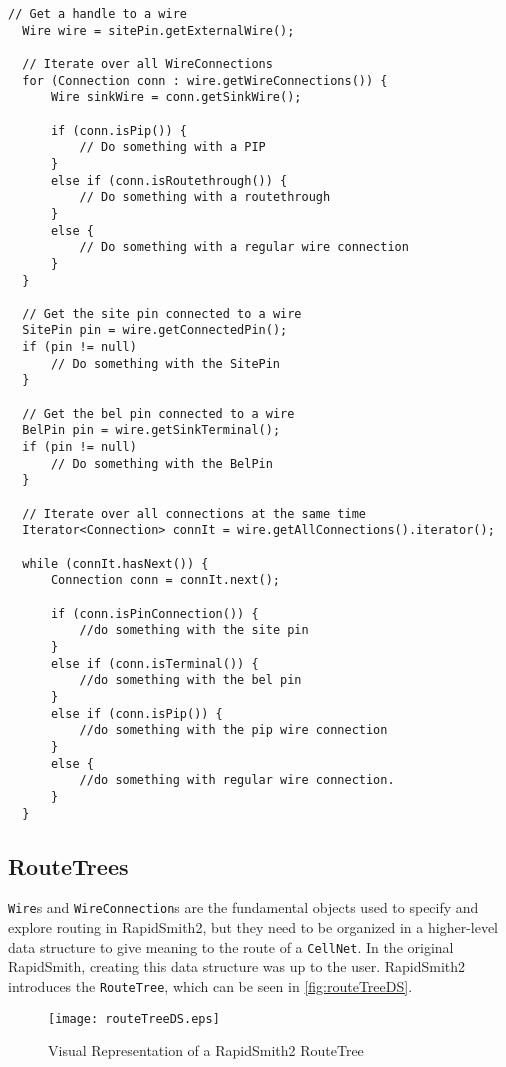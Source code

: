 \begin{lstlisting}[xleftmargin=1.5em, framexleftmargin=1.5em, caption=How to
iterate over Connections in RapidSmith2, label=code:connections] 
  // Get a handle to a wire
  Wire wire = sitePin.getExternalWire();

  // Iterate over all WireConnections
  for (Connection conn : wire.getWireConnections()) {
	  Wire sinkWire = conn.getSinkWire();

	  if (conn.isPip()) {
		  // Do something with a PIP
	  } 
	  else if (conn.isRoutethrough()) {
		  // Do something with a routethrough
	  } 
	  else {	
		  // Do something with a regular wire connection				
	  }
  }

  // Get the site pin connected to a wire
  SitePin pin = wire.getConnectedPin();
  if (pin != null)
	  // Do something with the SitePin
  }

  // Get the bel pin connected to a wire
  BelPin pin = wire.getSinkTerminal();
  if (pin != null)
	  // Do something with the BelPin
  }

  // Iterate over all connections at the same time
  Iterator<Connection> connIt = wire.getAllConnections().iterator();

  while (connIt.hasNext()) {
	  Connection conn = connIt.next();
	
	  if (conn.isPinConnection()) {
		  //do something with the site pin
	  }
	  else if (conn.isTerminal()) {
		  //do something with the bel pin 
	  }
	  else if (conn.isPip()) {
		  //do something with the pip wire connection
	  }
	  else {
		  //do something with regular wire connection.
	  }
  }
\end{lstlisting}

\subsection{RouteTrees}

\texttt{Wire}s and \texttt{WireConnection}s are the fundamental objects used to
specify and explore routing in RapidSmith2, but they need to be organized in
a higher-level data structure to give meaning to the route of a \texttt{CellNet}.
In the original RapidSmith, creating this data structure was up to the user.
RapidSmith2 introduces the \texttt{RouteTree}, which can be seen in
\autoref{fig:routeTreeDS}.

\begin{figure}[H]
\centering
\texttt{[image: routeTreeDS.eps]}
\caption{Visual Representation of a RapidSmith2 RouteTree}
\label{fig:routeTreeDS}
\end{figure}

